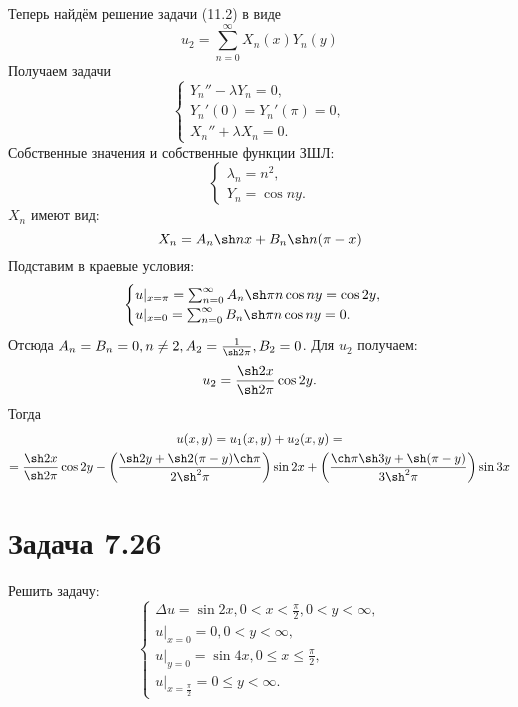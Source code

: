 \documentclass[11pt]{article}
\begin{document}
Теперь найдём решение задачи (11.2) в виде
\begin{equation*}
u_2 = \sum_{n = 0}^{\infty}X_n(x)Y_n(y)
\end{equation*}
Получаем задачи
\begin{equation*}
\begin{cases}
Y_n'' - \lambda Y_n = 0, \\
Y_n'(0) = Y_n'(\pi) = 0, \\
X_n'' + \lambda X_n = 0.
\end{cases}
\end{equation*}
Собственные значения и собственные функции ЗШЛ:
\begin{equation*}
\begin{cases}
\lambda_n = n^2, \\
Y_n = \cos ny.
\end{cases}
\end{equation*}
$X_n$ имеют вид:
\begin{equation*}
X_n = A_n\sh nx + B_n\sh n(\pi - x)
\end{equation*}
Подставим в краевые условия:
\begin{equation*}
\begin{cases}
u|_{x = \pi} = \sum_{n = 0}^{\infty}A_n\sh\pi n\cos ny = \cos2y, \\
u|_{x = 0} = \sum_{n = 0}^{\infty}B_n\sh\pi n\cos ny = 0.
\end{cases}
\end{equation*}
Отсюда $A_n = B_n = 0, n \neq 2, A_2 = \frac1{\sh2\pi}, B_2 = 0$. Для $u_2$ получаем:
\begin{equation}
u_2 = \frac{\sh2x}{\sh2\pi}\cos2y.
\end{equation}
Тогда
\begin{multline}
u(x, y) = u_1(x, y) + u_2(x, y) = \\
= \frac{\sh2x}{\sh2\pi}\cos2y -
\left(\frac{\sh2y + \sh2(\pi - y)\ch\pi}{2\sh^2\pi}\right)\sin2x +
\left(\frac{\ch\pi\sh3y + \sh(\pi - y)}{3\sh^2\pi}\right)\sin3x
\end{multline}
\section{Задача 7.26}
\label{sec:orgb7ad079}
Решить задачу:
\begin{equation}
\begin{cases}
\Delta u = \sin2x, 0 < x < \frac{\pi}2, 0 < y < \infty, \\
u|_{x = 0} = 0, 0 < y < \infty, \\
u|_{y = 0} = \sin4x, 0 \leq x \leq \frac{\pi}2, \\
u|_{x = \frac{\pi}2} = 0 \leq y < \infty.
\end{cases}
\end{equation}
\end{document}
